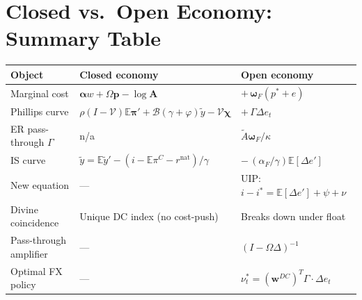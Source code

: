 \documentclass[11pt]{article}
\begin{document}
\section{Closed vs.\ Open Economy: Summary Table}

\begin{center}
\renewcommand{\arraystretch}{1.4}
\begin{tabular}{lll}
\toprule
\textbf{Object} & \textbf{Closed economy} & \textbf{Open economy}\\
\midrule
Marginal cost & $\boldsymbol\alpha w + \Omega\mathbf{p} - \log\mathbf{A}$ & $+\,\boldsymbol\omega_F(p^*+e)$\\
Phillips curve & $\rho(I-\mathcal{V})\mathbb{E}\boldsymbol\pi' + \mathcal{B}(\gamma+\varphi)\tilde{y} - \mathcal{V}\boldsymbol\chi$ & $+\,\Gamma\Delta e_t$\\
ER pass-through $\Gamma$ & n/a & $\widetilde{A}\boldsymbol\omega_F/\kappa$\\
IS curve & $\tilde{y} = \mathbb{E}\tilde{y}' - (i-\mathbb{E}\pi^C - r^{\text{nat}})/\gamma$ & $-\,(\alpha_F/\gamma)\mathbb{E}[\Delta e']$\\
New equation & --- & UIP: $i - i^* = \mathbb{E}[\Delta e'] + \psi + \nu$\\
Divine coincidence & Unique DC index (no cost-push) & Breaks down under float\\
Pass-through amplifier & --- & $(I-\Omega\Delta)^{-1}$\\
Optimal FX policy & --- & $\nu_t^* = (\mathbf{w}^{DC})^T\Gamma\cdot\Delta e_t$\\
\bottomrule
\end{tabular}
\end{center}
\end{document}
